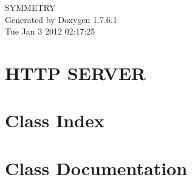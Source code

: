 \documentclass[a4paper]{book}
\begin{document}
\hypersetup{pageanchor=false,citecolor=blue}
\begin{titlepage}
\vspace*{7cm}
\begin{center}
{\Large \-S\-Y\-M\-M\-E\-T\-R\-Y }\\
\vspace*{1cm}
{\large \-Generated by Doxygen 1.7.6.1}\\
\vspace*{0.5cm}
{\small Tue Jan 3 2012 02:17:25}\\
\end{center}
\end{titlepage}
\clearemptydoublepage
{}
\tableofcontents
\clearemptydoublepage
{}
\hypersetup{pageanchor=true,citecolor=blue}
\chapter{\-H\-T\-T\-P \-S\-E\-R\-V\-E\-R}
\label{index}\hypertarget{index}{}
\chapter{\-Class \-Index}

\chapter{\-Class \-Documentation}









\printindex
\end{document}
